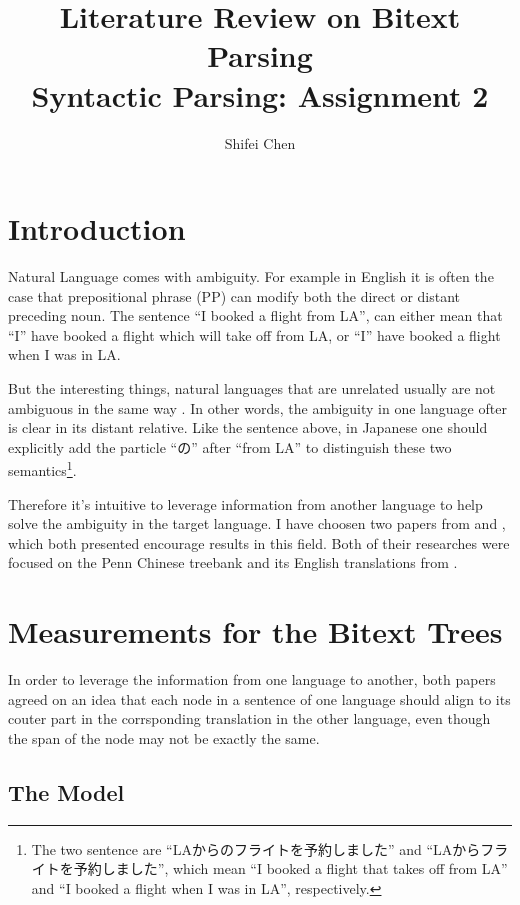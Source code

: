 \documentclass[11pt]{article} %
\title{{\LARGE Literature Review on Bitext Parsing}\\[1.5mm]Syntactic Parsing: Assignment 2\\} %
\author{Shifei Chen} %
\begin{document}
\maketitle

\section{Introduction}
Natural Language comes with ambiguity. For example in English it is often the case that prepositional phrase (PP) can modify both the direct or distant  preceding noun. The sentence ``I booked a flight from LA'', can either mean that ``I'' have booked a flight which will take off from LA, or ``I'' have booked a flight when I was in LA.

But the interesting things, natural languages that are unrelated usually are not ambiguous in the same way \citep{Huang:2009:BSP:1699648.1699668}. In other words, the ambiguity in one language ofter is clear in its distant relative. Like the sentence above, in Japanese one should explicitly add the particle ``の'' after ``from LA'' to distinguish these two semantics\footnote{The two sentence are ``LAからのフライトを予約しました'' and ``LAからフライトを予約しました'', which mean ``I booked a flight that takes off from LA'' and ``I booked a flight when I was in LA'', respectively.}.

Therefore it's intuitive to leverage information from another language to help solve the ambiguity in the target language. I have choosen two papers from \cite{Burkett:2008:TLB:1613715.1613828} and \cite{Huang:2009:BSP:1699648.1699668}, which both presented encourage results in this field. Both of their researches were focused on the Penn Chinese treebank and its English translations from \cite{xue2002building}.

\section{Measurements for the Bitext Trees}

In order to leverage the information from one language to another, both papers agreed on an idea that each node in a sentence of one language should align to its couter part in the corrsponding translation in the other language, even though the span of the node may not be exactly the same.

\subsection{The Model}
\end{document}
